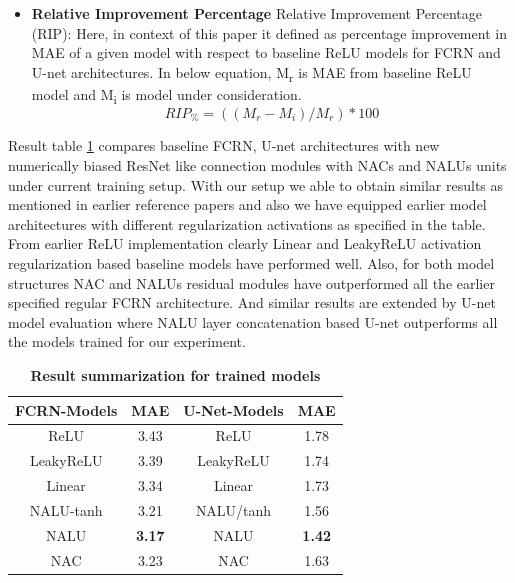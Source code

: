 \documentclass[runningheads]{llncs}
\begin{document}
\begin{itemize}
\item \textbf{Relative Improvement  Percentage}
Relative Improvement  Percentage (RIP): Here, in context of this paper it defined as percentage improvement in MAE of a given model with respect to baseline ReLU models for FCRN and U-net architectures. In below equation, M\textsubscript{r} is MAE from baseline ReLU model and M\textsubscript{i} is model under consideration.
\begin{equation}
 RIP_\% = ((M_r - M_i) / M_r) * 100
\end{equation}

\end{itemize}

Result table \ref{tab:table2} compares baseline FCRN, U-net architectures with new numerically biased ResNet like  connection modules with NACs and NALUs units under current training setup. With our setup we able to obtain similar results as mentioned in earlier reference papers and also we have equipped earlier model architectures with different regularization activations as specified in the table. From earlier ReLU implementation clearly Linear and LeakyReLU activation regularization based baseline models have performed well. Also, for both model structures NAC and NALUs residual modules have outperformed all the earlier specified regular FCRN architecture. And similar results are extended by U-net model evaluation where NALU layer concatenation based U-net outperforms all the models trained for our experiment.

\bgroup
\def\arraystretch{1.25}
\begin{table}[h!]
  \begin{center}
    \caption{\textbf{Result summarization for trained models}}
    \label{tab:table2}
    \begin{tabular}{|c|c|c|c|}
    
    \hline
      \textbf{FCRN-Models} & \textbf{MAE} & \textbf{U-Net-Models} & \textbf{MAE} \\
    \hline

     ReLU  & 3.43 & ReLU & 1.78\\
     LeakyReLU  & 3.39 & LeakyReLU & 1.74\\
     Linear  & 3.34 & Linear & 1.73\\
	 NALU-tanh & 3.21 & NALU/tanh & 1.56\\
	 NALU & \textbf{3.17} & NALU & \textbf{1.42}\\
     NAC & 3.23 & NAC & 1.63\\
     
     \hline
     \end{tabular}
  \end{center}
\end{table}
\egroup
\end{document}
